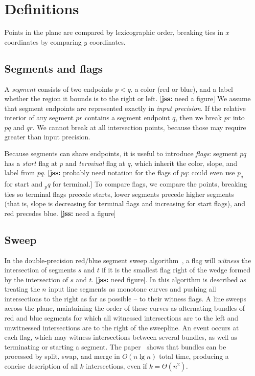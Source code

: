 \documentclass[11pt]{article}
\def\jss#1{{\footnotesize [{\bf jss:} #1]}}
\begin{document}
\section{Definitions}
Points in the plane are compared by lexicographic order, breaking ties in $x$ coordinates by comparing $y$ coordinates.

\subsection{Segments and flags}
A \textit{segment} consists of two endpoints $p<q$, a color (red or blue), and
a label whether the region it bounds is to the right or left. \jss{need a figure}
We assume that segment endpoints are represented exactly in {\it input precision}.
If the relative interior of any segment $pr$ contains a segment endpoint $q$, 
then we break $pr$ into $pq$ and $qr$. We cannot break at all intersection points, 
because those may require greater than input precision. 

Because segments can share endpoints, it is useful to introduce \textit{flags}: 
segment $pq$ has a \textit{start} flag at $p$ and \textit{terminal} flag at $q$, 
which inherit the color, slope, and label from $pq$. 
\jss{probably need notation for the flags of $pq$: could even use $p_q$ for start and $_pq$ for terminal.}
To compare flags, we compare the points, breaking ties so terminal flags precede starts, 
lower segments precede higher segments (that is, slope is decreasing for terminal flags and increasing for start flags), and red precedes blue. \jss{need a figure}

\subsection{Sweep}\label{sec sweep}
In the double-precision red/blue segment sweep algorithm~\cite{MS}, a flag will \textit{witness} the intersection of segments $s$ and $t$ if it is the smallest flag right of the wedge formed by the intersection of $s$ and $t$. \jss{need figure}. 
In \cite{MS} this algorithm is described as 
treating the $n$ input line segments as monotone curves and pushing all intersections to the right as far as possible -- to their witness flags. 
A line sweeps across the plane, maintaining the order of these curves as alternating bundles of red and blue segments for which all witnessed intersections are to the left and unwitnessed intersections are to the right of the sweepline. 
An event occurs at each flag, which may witness intersections between several bundles, as well as terminating or starting a segment.  
The paper~\cite{MS} shows that bundles can be processed by split, swap, and merge in $O(n\lg n)$ total time, producing a concise description of all $k$ intersections, even if $k=\Theta(n^2)$.
\end{document}
